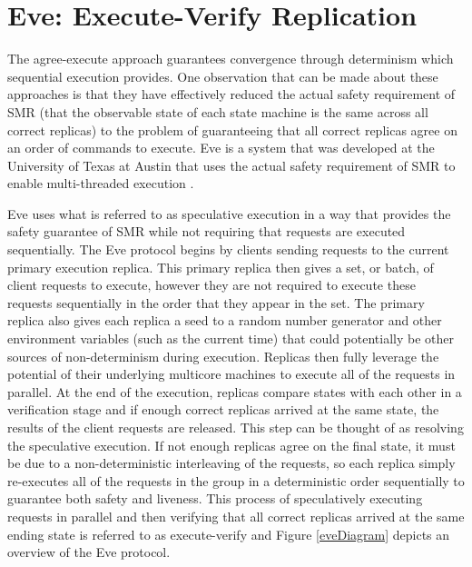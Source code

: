 \documentclass[11pt, oneside]{report}
\begin{document}
\section{Eve: Execute-Verify Replication}
The agree-execute approach guarantees convergence through determinism which sequential execution provides. 
One observation that can be made about these approaches is that they have effectively reduced the actual safety requirement of SMR (that the observable state of each state machine is the same across all correct replicas) to the problem of guaranteeing that all correct replicas agree on an order of commands to execute. 
Eve is a system that was developed at the University of Texas at Austin that uses the actual safety requirement of SMR to enable multi-threaded execution \cite{manosThesis, eve}.

Eve uses what is referred to as speculative execution \cite{eve, zyz} in a way that provides the safety guarantee of SMR while not requiring that requests are executed sequentially. 
The Eve protocol begins by clients sending requests to the current primary execution replica.
This primary replica then gives a set, or batch, of client requests to execute, however they are not required to execute these requests sequentially in the order that they appear in the set. 
The primary replica also gives each replica a seed to a random number generator and other environment variables (such as the current time) that could potentially be other sources of non-determinism during execution.
Replicas then fully leverage the potential of their underlying multicore machines to execute all of the requests in parallel. 
At the end of the execution, replicas compare states with each other in a verification stage and if enough correct replicas arrived at the same state, the results of the client requests are released. 
This step can be thought of as resolving the speculative execution. 
If not enough replicas agree on the final state, it must be due to a non-deterministic interleaving of the requests, so each replica simply re-executes all of the requests in the group in a deterministic order sequentially to guarantee both safety and liveness. 
This process of speculatively executing requests in parallel and then verifying that all correct replicas arrived at the same ending state is referred to as execute-verify and Figure \ref{eveDiagram} depicts an overview of the Eve protocol.
\end{document}
